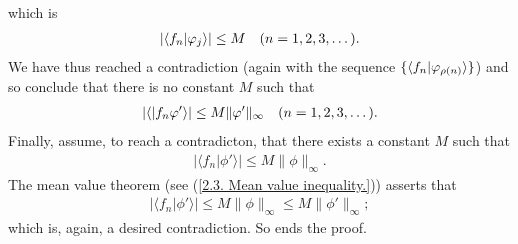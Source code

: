 %
which is %
%
  \begin{align}
    \lvert
      \langle{f_n}\lvert{\varphi_j}\rangle
    \rvert 
      \leq 
    M 
    \quad (n=1, 2, 3, \dots).
  \end{align}
%
We have thus reached a contradiction (again with the sequence %
%
  $\{\langle f_n\lvert \varphi_{\rho(n)} \rangle\}$) %
%
and so conclude that there is no constant $M$ such that %
%
  \begin{align}
    \lvert 
      \langle \lvert f_n \varphi'\rangle
    \rvert 
      \leq 
    M \| \varphi' \|_\infty
    \quad (n=1, 2, 3, \dots).
  \end{align}
%
Finally, assume, to reach a contradicton, that %
there exists a constant $M$ such that 
%
  \begin{align}
    \lvert \langle f_n \lvert \phi' \rangle \rvert 
      \leq 
    M \| \phi \|_\infty.
  \end{align}
%
The mean value theorem (see (\ref{2.3. Mean value inequality.})) asserts that %
%
  \begin{align}
    \lvert \langle f_n \lvert \phi' \rangle \rvert 
      \leq 
    M \| \phi \|_\infty 
      \leq 
    M \| \phi' \|_\infty; 
  \end{align}
%
which is, again, a desired contradiction. So ends the proof.

